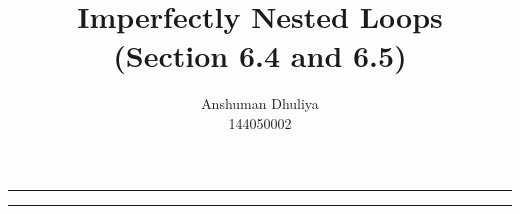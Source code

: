 \documentclass[a4paper]{article}
\author{Anshuman Dhuliya\\144050002}
\title{Imperfectly Nested Loops\\(Section 6.4 and 6.5)}
\begin{document}
\maketitle

\noindent
\rule{\textwidth}{2pt}%

\tableofcontents

\noindent
\rule{\textwidth}{2pt}%





\end{document}
